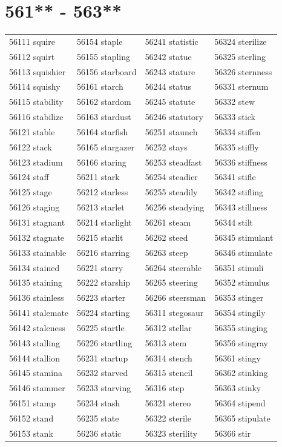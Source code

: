 \documentclass[10pt, oneside]{book}
\begin{document}
\begin{table}
	\centering
	\section*{561** - 563**}
	\begin{tabular}{l l l l}
56111 squire &56154 staple &56241 statistic &56324 sterilize\\
56112 squirt &56155 stapling &56242 statue &56325 sterling\\
56113 squishier &56156 starboard &56243 stature &56326 sternness\\
56114 squishy &56161 starch &56244 status &56331 sternum\\
56115 stability &56162 stardom &56245 statute &56332 stew\\
56116 stabilize &56163 stardust &56246 statutory &56333 stick\\
56121 stable &56164 starfish &56251 staunch &56334 stiffen\\
56122 stack &56165 stargazer &56252 stays &56335 stiffly\\
56123 stadium &56166 staring &56253 steadfast &56336 stiffness\\
56124 staff &56211 stark &56254 steadier &56341 stifle\\
56125 stage &56212 starless &56255 steadily &56342 stifling\\
56126 staging &56213 starlet &56256 steadying &56343 stillness\\
56131 stagnant &56214 starlight &56261 steam &56344 stilt\\
56132 stagnate &56215 starlit &56262 steed &56345 stimulant\\
56133 stainable &56216 starring &56263 steep &56346 stimulate\\
56134 stained &56221 starry &56264 steerable &56351 stimuli\\
56135 staining &56222 starship &56265 steering &56352 stimulus\\
56136 stainless &56223 starter &56266 steersman &56353 stinger\\
56141 stalemate &56224 starting &56311 stegosaur &56354 stingily\\
56142 staleness &56225 startle &56312 stellar &56355 stinging\\
56143 stalling &56226 startling &56313 stem &56356 stingray\\
56144 stallion &56231 startup &56314 stench &56361 stingy\\
56145 stamina &56232 starved &56315 stencil &56362 stinking\\
56146 stammer &56233 starving &56316 step &56363 stinky\\
56151 stamp &56234 stash &56321 stereo &56364 stipend\\
56152 stand &56235 state &56322 sterile &56365 stipulate\\
56153 stank &56236 static &56323 sterility &56366 stir\\
	\end{tabular}
 \end{table}
\clearpage
\end{document}
